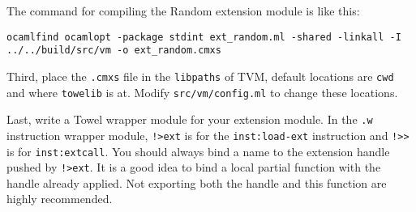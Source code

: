 \documentclass{article}
\newcommand{\inst}[1] {\texttt{inst:#1}}
\begin{document}
The command for compiling the Random extension module is like this:\newline

\texttt{ocamlfind ocamlopt -package stdint ext\_random.ml -shared -linkall -I ../../build/src/vm -o ext\_random.cmxs}
\newline

Third, place the \texttt{.cmxs} file in the \texttt{libpaths} of TVM, default locations are \texttt{cwd} and where \texttt{towelib} is at. Modify \texttt{src/vm/config.ml} to change these locations.

Last, write a Towel wrapper module for your extension module. In the \texttt{.w} instruction wrapper module, \texttt{!>ext} is for the \inst{load-ext} instruction and \texttt{!>>} is for \inst{extcall}. You should always bind a name to the extension handle pushed by \texttt{!>ext}. It is a good idea to bind a local partial function with the handle already applied. Not exporting both the handle and this function are highly recommended.
\end{document}
